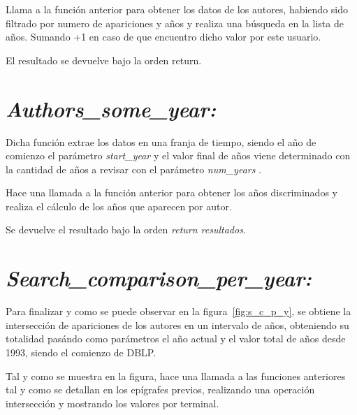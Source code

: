 \documentclass[a4paper, 12pt]{book}
\begin{document}
Llama a la función anterior para obtener los datos de los autores, habiendo sido filtrado por numero de apariciones y años y realiza una búsqueda en la lista de años. Sumando +1 en caso de que encuentro dicho valor por este usuario.

El resultado se devuelve bajo la orden return.

\section{\textit{Authors\_some\_year:}}

Dicha función extrae los datos en una franja de tiempo, siendo el año de comienzo el parámetro \textit{start\_year} y el valor final de años viene determinado con la cantidad de años a revisar con el parámetro \textit{num\_years} .

Hace una llamada a la función anterior para obtener los años discriminados y realiza el cálculo de los años que aparecen por autor.

Se devuelve el resultado bajo la orden \textit{return resultados}.

\section{\textit{Search\_comparison\_per\_year:}}
Para finalizar y como se puede observar en la figura~\ref{fig:s_c_p_y}, se obtiene la intersección de apariciones de los autores en un intervalo de años, obteniendo su totalidad pasándo como parámetros el año actual y el valor total de años desde 1993, siendo el comienzo de DBLP.

Tal y como se muestra en la figura, hace una llamada a las funciones anteriores tal y como se detallan en los epígrafes previos, realizando una operación intersección y mostrando los valores por terminal.
\end{document}
